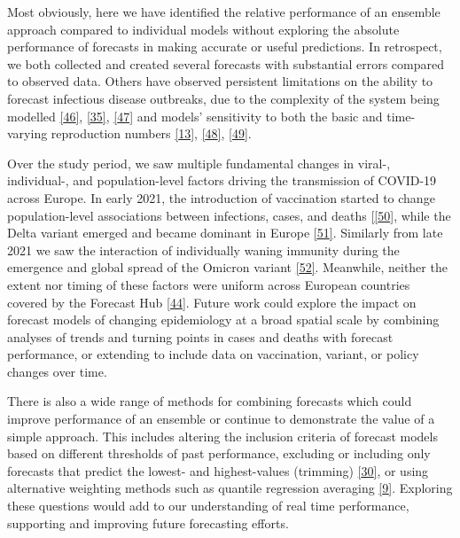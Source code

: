 \documentclass[
]{article}
\begin{document}
Most obviously, here we have identified the relative performance of an
ensemble approach compared to individual models without exploring the
absolute performance of forecasts in making accurate or useful
predictions. In retrospect, we both collected and created several
forecasts with substantial errors compared to observed data. Others have
observed persistent limitations on the ability to forecast infectious
disease outbreaks, due to the complexity of the system being modelled
\protect\hyperlink{ref-scarpinoPredictabilityInfectiousDisease2019}{{[}46{]}},
\protect\hyperlink{ref-castroTurningPointEnd2020}{{[}35{]}},
\protect\hyperlink{ref-rosenkrantzFundamentalLimitationsEfficiently2022}{{[}47{]}}
and models' sensitivity to both the basic and time-varying reproduction
numbers
\protect\hyperlink{ref-viboudRAPIDDEbolaForecasting2018}{{[}13{]}},
\protect\hyperlink{ref-coriKeyDataOutbreak2017}{{[}48{]}},
\protect\hyperlink{ref-desaiRealtimeEpidemicForecasting2019}{{[}49{]}}.

Over the study period, we saw multiple fundamental changes in viral-,
individual-, and population-level factors driving the transmission of
COVID-19 across Europe. In early 2021, the introduction of vaccination
started to change population-level associations between infections,
cases, and deaths
{[}\protect\hyperlink{ref-europeancentrefordiseasepreventionandcontrolInterimGuidanceBenefits2021}{{[}50{]}},
while the Delta variant emerged and became dominant in Europe
\protect\hyperlink{ref-europeancentrefordiseasepreventionandcontrolThreatAssessmentBrief2021}{{[}51{]}}.
Similarly from late 2021 we saw the interaction of individually waning
immunity during the emergence and global spread of the Omicron variant
\protect\hyperlink{ref-europeancentrefordiseasepreventionandcontrolAssessmentFurtherSpread2022}{{[}52{]}}.
Meanwhile, neither the extent nor timing of these factors were uniform
across European countries covered by the Forecast Hub
\protect\hyperlink{ref-europeancentrefordiseasepreventionandcontrolOverviewImplementationCOVID192021}{{[}44{]}}.
Future work could explore the impact on forecast models of changing
epidemiology at a broad spatial scale by combining analyses of trends
and turning points in cases and deaths with forecast performance, or
extending to include data on vaccination, variant, or policy changes
over time.

There is also a wide range of methods for combining forecasts which
could improve performance of an ensemble or continue to demonstrate the
value of a simple approach. This includes altering the inclusion
criteria of forecast models based on different thresholds of past
performance, excluding or including only forecasts that predict the
lowest- and highest-values (trimming)
\protect\hyperlink{ref-taylorCombiningProbabilisticForecasts2021}{{[}30{]}},
or using alternative weighting methods such as quantile regression
averaging
\protect\hyperlink{ref-funkShorttermForecastsInform2020}{{[}9{]}}.
Exploring these questions would add to our understanding of real time
performance, supporting and improving future forecasting efforts.
\end{document}
